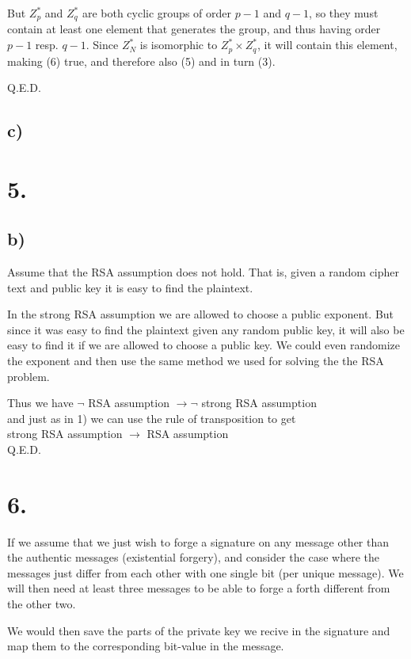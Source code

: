 \documentclass[a4paper,11pt]{article}
\begin{document}
	But $Z^*_p$ and $Z^*_q$ are both cyclic groups of order $p-1$ and $q-1$,
	so they must contain at least one element that generates the group, 
	and thus having order $p-1$ resp. $q-1$. Since $Z^*_N$ is isomorphic to $Z^*_p \times Z^*_q$,
	it will contain this element, making (6) true, and therefore also (5) and in turn (3).

	Q.E.D.

	\subsection*{c) }

	\section*{5. }

	\subsection*{b) }
	Assume that the RSA assumption does not hold. That is, given a random cipher text and
	public key it is easy to find the plaintext.
	
	In the strong RSA assumption we are allowed to choose a public exponent. But since it was
	easy to find the plaintext given any random public key, it will also be easy to find
	it if we are allowed to choose a public key. We could even randomize the exponent
	and then use the same method we used for solving the the RSA problem.

	Thus we have $\neg $ RSA assumption $ \to \neg $ strong RSA assumption\\
	and just as in 1) we can use the rule of transposition to get\\
	strong RSA assumption $ \to $ RSA assumption\\

	Q.E.D.

	\section*{6. }
	If we assume that we just wish to forge a signature on any message other than the authentic
	messages (existential forgery), and consider the case where the messages just differ from 
	each other with one single bit (per unique message). We will then need at least three 
	messages to be able to forge a forth different from the other two.

	We would then save the parts of the private key we recive in the signature and map
	them to the corresponding bit-value in the message.

		 
		
\end{document}
